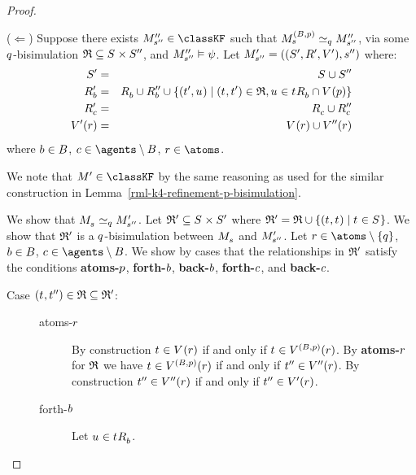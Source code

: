 \begin{proof}
\begin{description}
        ($\Leftarrow$)
        Suppose there exists $\kPModelPP{\kStateSPP} \in \classKF$ such that $\kPModel[(\agentsB, \atomP)]{\kStateS} \bisimilar[\atomQ] \kPModelPP{\kStateSPP}$, via some $q$-bisimulation $\bisimulation \subseteq \kStates \times \kStatesPP$, and ${M^{\prime\prime}_{{s}^{\prime\prime}}} \vDash \psi$.
        Let $\kPModelAndTupleP{\kStateSPP}$ where:
        \begin{eqnarray*}
            \kStatesP &=& \kStates \cup \kStatesPP\\
            \kAccessibilityPB &=& \kAccessibilityB \cup \kAccessibilityPPB \cup \{(\kStateTP, \kStateU) \mid (\kStateT, \kStateTP) \in \bisimulation, \kStateU \in \kSuccessorsB{\kStateT} \cap \kValuation(\atomP)\}\\
            \kAccessibilityPC &=& \kAccessibilityC \cup \kAccessibilityPPC\\
            \kValuationP(\atomR) &=& \kValuation(\atomR) \cup \kValuationPP(\atomR)
        \end{eqnarray*}
        where $b \in B$, $\agentC \in \agents \setminus \agentsB$, $\atomR \in \atoms$.

        We note that $\kModelP \in \classKF$ by the same reasoning as used for the similar construction in Lemma~\ref{rml-k4-refinement-p-bisimulation}.

        We show that $\kPModel{\kStateS} \bisimilar[\atomQ] \kPModelP{\kStateSPP}$.
        Let $\bisimulation' \subseteq \kStates \times \kStatesP$ where $\bisimulation' = \bisimulation \cup \{(\kStateT, \kStateT) \mid \kStateT \in \kStates\}$.
        We show that $\mathfrak{R}'$ is a $q$-bisimulation between $\kPModel{\kStateS}$ and ${M^{\prime}_{{s}^{\prime\prime}}}$.
        Let $\atomR \in \atoms \setminus \{\atomQ\}$, $b \in B$, $\agentC \in \agents \setminus \agentsB$.
        We show by cases that the relationships in $\mathfrak{R}'$ satisfy the conditions {\bf atoms-$p$}, {\bf forth-$b$}, {\bf back-$b$}, {\bf forth-$c$}, and {\bf back-$c$}.
        \begin{description}
            \item[{Case $(\kStateT, \kStateTPP) \in \bisimulation \subseteq \bisimulation'$:}]
                \hfill
                \begin{description}
                    \item[atoms-$r$] 
                        By construction $\kStateT \in \kValuation(\atomR)$ if and only if $\kStateT \in \kValuation[(\agentsB, \atomP)](\atomR)$.
                        By {\bf atoms-$r$} for $\mathfrak{R}$ we have $\kStateT \in \kValuation[(\agentsB, \atomP)](\atomR)$ if and only if ${t}^{\prime\prime} \in {V^{\prime\prime}}(r)$.
                        By construction ${t}^{\prime\prime} \in {V^{\prime\prime}}(r)$ if and only if ${t}^{\prime\prime} \in {V^{\prime}}(r)$.
                    \item[forth-$b$]
                        Let $\kStateU \in \kSuccessorsB{\kStateT}$.


\end{description}
\end{description}
\end{description}
\end{proof}
